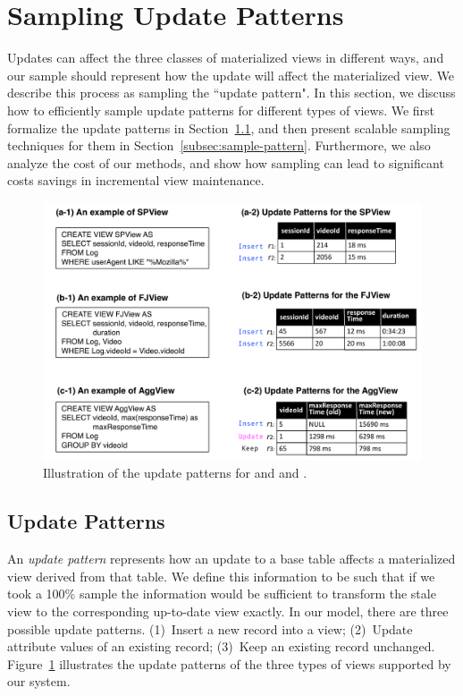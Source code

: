 \section{Sampling Update Patterns}
\label{sampling}
Updates can affect the three classes of materialized views in different ways, 
and our sample should represent how the update will affect the materialized view.
We describe this process as sampling the ``update pattern".
In this section, we discuss how to efficiently sample update patterns for different types of views.
We first formalize the update patterns in Section~\ref{subsec:pattern}, and then present scalable sampling techniques for them in Section~\ref{subsec:sample-pattern}. Furthermore, we also analyze the cost of our methods, and show how sampling can lead to significant costs savings in incremental view maintenance.

\begin{figure}[tup]
\centering
 \hspace*{-2em}\includegraphics[scale=0.38]{figs/update-pattern-new.pdf}\vspace{-1em}
 \caption{Illustration of the update patterns for \spview and \fjview and \aggview.}\label{fig:update-pattern}\vspace{-1em}
\end{figure}


\subsection{Update Patterns}\label{subsec:pattern}
An \emph{update pattern} represents how an update to a base table affects a materialized view derived from that table.
We define this information to be such that if we took a 100\% sample the information would be sufficient to transform the stale view to the corresponding up-to-date view exactly. 
In our model, there are three possible update patterns. (1)~Insert a new record into a view;
(2)~Update attribute values of an existing record; (3)~Keep an existing record unchanged.
Figure~\ref{fig:update-pattern} illustrates the update patterns of the three types of views supported by our system.


